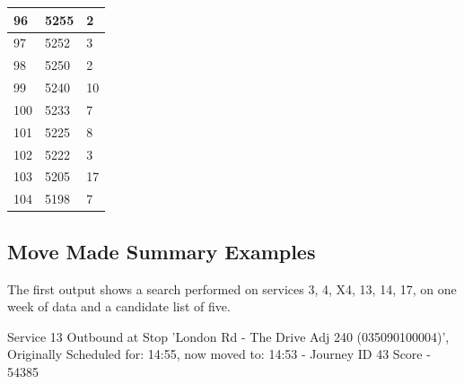 \documentclass{article}
\begin{document}
\begin{center}
\begin{longtable}{|l|l|l|}
		\hline
		96                                                        & 5255                                                               & 2       \\ 
		\hline
		97                                                        & 5252                                                               & 3       \\ 
		\hline
		98                                                        & 5250                                                               & 2       \\ 
		\hline
		99                                                        & 5240                                                               & 10      \\ 
		\hline
		100                                                       & 5233                                                               & 7       \\ 
		\hline
		101                                                       & 5225                                                               & 8       \\ 
		\hline
		102                                                       & 5222                                                               & 3       \\ 
		\hline
		103                                                       & 5205                                                               & 17      \\ 
		\hline
		104                                                       & 5198                                                               & 7       \\
		\hline
	\end{longtable}
\end{center}


\subsection{Move Made Summary Examples}
\label{moveSummary}

The first output shows a search performed on services 3, 4, X4, 13, 14, 17, on one week of data and a candidate list of five.



\par
Service 13 Outbound at Stop 'London Rd - The Drive Adj 240 (035090100004)', Originally Scheduled for: 14:55, now moved to: 14:53 - Journey ID 43      Score - 54385
\end{document}

